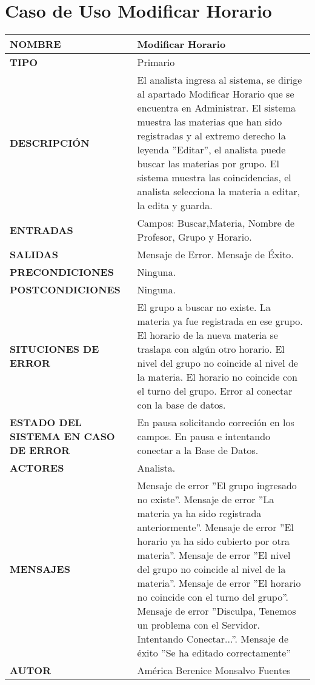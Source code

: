 \newpage
\section{Caso de Uso Modificar Horario}
\begin{longtable}{ | p{6cm} | p{10cm} |}
		\hline
	\textbf{NOMBRE}
	&
	Modificar Horario\\
	\hline
	\textbf{TIPO}
	&
	Primario\\
	\hline
	\textbf{DESCRIPCIÓN}
	&
	El analista ingresa al sistema, se dirige al apartado Modificar Horario que se encuentra en Administrar. El sistema muestra las materias que han sido registradas y al extremo derecho la leyenda ''Editar'', el analista puede buscar las materias por grupo. El sistema muestra las coincidencias, el analista selecciona la materia a editar, la edita y guarda.\\
	\hline
	\textbf{ENTRADAS}
	&
	Campos: Buscar,Materia, Nombre de Profesor, Grupo y Horario.\\
	\hline
	\textbf{SALIDAS}
	&
	Mensaje de Error.\newline
	Mensaje de Éxito.\\
	\hline
	\textbf{PRECONDICIONES}
	&
	Ninguna.\\
	\hline
	\textbf{POSTCONDICIONES}
	&
	Ninguna.\\
	\hline
	\textbf{SITUCIONES DE ERROR}
	&
	El grupo a buscar no existe.\newline
	La materia ya fue registrada en ese grupo.\newline
	El horario de la nueva materia se traslapa con algún otro horario.\newline
	El nivel del grupo no coincide al nivel de la materia.\newline
	El horario no coincide con el turno del grupo.\newline
	Error al conectar con la base de datos.\\
	\hline
	\textbf{ESTADO DEL SISTEMA EN CASO DE ERROR}
	&
	En pausa solicitando correción en los campos.\newline
	En pausa e intentando conectar a la Base de Datos.\\
	\hline
	\textbf{ACTORES}
	&
	Analista.\\
	\hline
	\textbf{MENSAJES}
	&
	Mensaje de error ''El grupo ingresado no existe''.\newline
	Mensaje de error ''La materia ya ha sido registrada anteriormente''.\newline
	Mensaje de error ''El horario ya ha sido cubierto por otra materia''.\newline
	Mensaje de error ''El nivel del grupo no coincide al nivel de la materia''.\newline
	Mensaje de error ''El horario no coincide con el turno del grupo''.\newline
	Mensaje de error ''Disculpa, Tenemos un problema con el Servidor. Intentando Conectar...''.\newline
	Mensaje de éxito ''Se ha editado correctamente''\\
	\hline
	\textbf{AUTOR}
	&
	América Berenice Monsalvo Fuentes\\
	\hline
\end{longtable}
